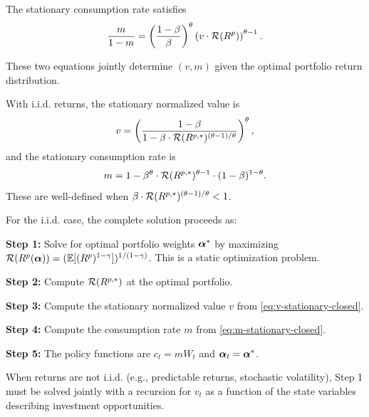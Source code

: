 The stationary consumption rate satisfies
\begin{equation}
\frac{m}{1-m} = \left( \frac{1-\beta}{\beta} \right)^{\theta} \left( v \cdot \mathcal{R}(R^p) \right)^{\theta - 1}.
\label{eq:stationary-m}
\end{equation}

These two equations jointly determine $(v, m)$ given the optimal portfolio return distribution.

\begin{proposition}
\label{prop:stationary}
With i.i.d. returns, the stationary normalized value is
\begin{equation}
v = \left( \frac{1-\beta}{1 - \beta \cdot \mathcal{R}(R^{p,*})^{(\theta-1)/\theta}} \right)^{\theta},
\label{eq:v-stationary-closed}
\end{equation}
and the stationary consumption rate is
\begin{equation}
m = 1 - \beta^{\theta} \cdot \mathcal{R}(R^{p,*})^{\theta - 1} \cdot (1-\beta)^{1-\theta}.
\label{eq:m-stationary-closed}
\end{equation}
These are well-defined when $\beta \cdot \mathcal{R}(R^{p,*})^{(\theta-1)/\theta} < 1$.
\end{proposition}

\begin{calloutimportant}
For the i.i.d. case, the complete solution proceeds as:

\textbf{Step 1:} Solve for optimal portfolio weights $\boldsymbol{\alpha}^{*}$ by maximizing $\mathcal{R}(R^p(\boldsymbol{\alpha})) = (\mathbb{E}[(R^p)^{1-\gamma}])^{1/(1-\gamma)}$. This is a static optimization problem.

\textbf{Step 2:} Compute $\mathcal{R}(R^{p,*})$ at the optimal portfolio.

\textbf{Step 3:} Compute the stationary normalized value $v$ from \eqref{eq:v-stationary-closed}.

\textbf{Step 4:} Compute the consumption rate $m$ from \eqref{eq:m-stationary-closed}.

\textbf{Step 5:} The policy functions are $c_t = m W_t$ and $\boldsymbol{\alpha}_t = \boldsymbol{\alpha}^{*}$.

When returns are not i.i.d. (e.g., predictable returns, stochastic volatility), Step 1 must be solved jointly with a recursion for $v_t$ as a function of the state variables describing investment opportunities.
\end{calloutimportant}


